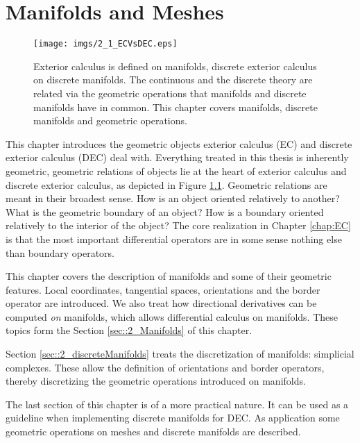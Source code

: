 \chapter{Manifolds and Meshes}
\label{chap:mfs_and_mshs}

\begin{figure}[h]
\begin{center}
\texttt{[image: imgs/2\_1\_ECVsDEC.eps]}
\end{center}
\vspace{-0.5cm}
\caption{Exterior calculus is defined on manifolds, discrete exterior calculus on discrete manifolds. The continuous and the discrete theory are related via the geometric operations that manifolds and discrete manifolds have in common.  This chapter covers manifolds, discrete manifolds and geometric operations.}
\label{fig:2_ECVvsDEC}
\end{figure}


This chapter introduces the geometric objects exterior calculus (EC) and discrete exterior calculus (DEC) deal with. Everything treated in this thesis is inherently geometric, geometric relations of objects lie at the heart of exterior calculus and discrete exterior calculus, as depicted in Figure \ref{fig:2_ECVvsDEC}. Geometric relations are meant in their broadest sense. How is an object oriented relatively to another? What is the geometric boundary of an object? How is a boundary oriented relatively to the interior of the object? The core realization in Chapter \ref{chap:EC} is that the most important differential operators are in some sense nothing else than boundary operators. 


This chapter covers the description of manifolds and some of their geometric features. Local coordinates, tangential spaces, orientations and the border operator are introduced. We also treat how directional derivatives can be computed \emph{on} manifolds, which allows differential calculus on manifolds. These topics form the Section \ref{sec::2_Manifolds} of this chapter.

Section \ref{sec::2_discreteManifolds} treats the discretization of manifolds: simplicial complexes. These allow the definition of orientations and border operators, thereby discretizing the geometric operations introduced on manifolds.

The last section of this chapter is of a more practical nature. It can be used as a guideline when implementing discrete manifolds for DEC. As application some geometric operations on meshes and discrete manifolds are described.


